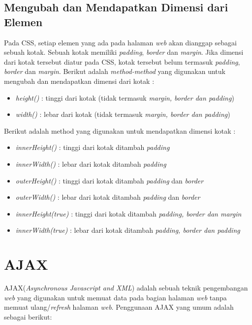\subsection{Mengubah dan Mendapatkan Dimensi dari Elemen}
Pada CSS, setiap elemen yang ada pada halaman \textit{web} akan dianggap sebagai sebuah kotak. Sebuah kotak memiliki \textit{padding}, \textit{border} dan \textit{margin}. Jika dimensi dari kotak tersebut diatur pada CSS, kotak tersebut belum termasuk \textit{padding}, \textit{border} dan \textit{margin}.
Berikut adalah \textit{method-method} yang digunakan untuk mengubah dan mendapatkan dimensi dari kotak :

\begin{itemize}
	\item \textit{height()} : tinggi dari kotak (tidak termasuk \textit{margin, border dan padding})
	\item \textit{width()} : lebar dari kotak (tidak termasuk \textit{margin, border dan padding})
\end{itemize}

Berikut adalah method yang digunakan untuk mendapatkan dimensi kotak :

\begin{itemize}
	\item \textit{innerHeight()} : tinggi dari kotak ditambah \textit{padding}
	\item \textit{innerWidth()} : lebar dari kotak ditambah \textit{padding}
	\item \textit{outerHeight()} : tinggi dari kotak ditambah \textit{padding} dan \textit{border}
	\item \textit{outerWidth()} : lebar dari kotak ditambah \textit{padding} dan \textit{border}
	\item \textit{innerHeight(true)} : tinggi dari kotak ditambah \textit{padding, border dan margin}
	\item \textit{innerWidth(true)} : lebar dari kotak ditambah \textit{padding, border dan padding}
\end{itemize}

\section{AJAX}
AJAX(\textit{Asynchronous Javascript and XML}) adalah sebuah teknik pengembangan \textit{web} yang digunakan untuk memuat data pada bagian halaman \textit{web} tanpa memuat ulang/\textit{refresh} halaman \textit{web}. Penggunaan AJAX yang umum adalah sebagai berikut:

